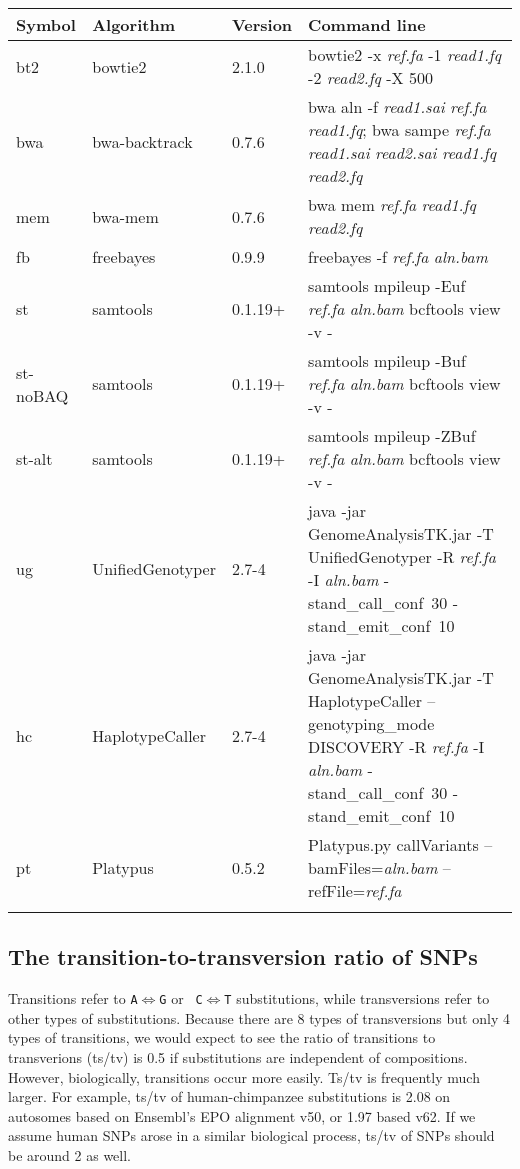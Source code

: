 \documentclass{bioinfo}
\begin{document}
\begin{table*}
\footnotesize
{}
{\begin{tabular*}{\textwidth}{@{\extracolsep{\fill}}lllp{12cm}}
\toprule
Symbol & Algorithm & Version & Command line \\
\midrule
bt2 & bowtie2 & 2.1.0 & bowtie2 -x \emph{ref.fa} -1 \emph{read1.fq} -2 \emph{read2.fq} -X 500 \\
bwa & bwa-backtrack & 0.7.6 & bwa aln -f \emph{read1.sai} \emph{ref.fa} \emph{read1.fq}; bwa sampe \emph{ref.fa} \emph{read1.sai} \emph{read2.sai} \emph{read1.fq} \emph{read2.fq} \\
mem & bwa-mem & 0.7.6 & bwa mem \emph{ref.fa} \emph{read1.fq} \emph{read2.fq} \\
fb & freebayes & 0.9.9 & freebayes -f \emph{ref.fa} \emph{aln.bam} \\
st & samtools & 0.1.19+ & samtools mpileup -Euf \emph{ref.fa} \emph{aln.bam} {\tt \char124} bcftools view -v - \\
st-noBAQ & samtools & 0.1.19+ & samtools mpileup -Buf \emph{ref.fa} \emph{aln.bam} {\tt \char124} bcftools view -v - \\
st-alt & samtools & 0.1.19+ & samtools mpileup -ZBuf \emph{ref.fa} \emph{aln.bam} {\tt \char124} bcftools view -v - \\
ug & UnifiedGenotyper & 2.7-4 & java -jar GenomeAnalysisTK.jar -T UnifiedGenotyper -R \emph{ref.fa} -I \emph{aln.bam} \mbox{-stand\_call\_conf 30} \mbox{-stand\_emit\_conf 10} \\
hc & HaplotypeCaller & 2.7-4 & java -jar GenomeAnalysisTK.jar -T HaplotypeCaller --genotyping\_mode DISCOVERY -R \emph{ref.fa} -I \emph{aln.bam} \mbox{-stand\_call\_conf 30} \mbox{-stand\_emit\_conf 10} \\
pt & Platypus & 0.5.2 & Platypus.py callVariants --bamFiles=\emph{aln.bam} --refFile=\emph{ref.fa} \\
\botrule
\end{tabular*}}{}
\end{table*}

\subsection{The transition-to-transversion ratio of SNPs}
Transitions refer to {\tt A}$\Leftrightarrow${\tt G} or {\tt
C}$\Leftrightarrow${\tt T} substitutions, while transversions refer to other
types of substitutions. Because there are 8 types of transversions but only 4
types of transitions, we would expect to see the ratio of transitions to
transverions (ts/tv) is 0.5 if substitutions are independent of compositions.
However, biologically, transitions occur more easily. Ts/tv is frequently much
larger. For example, ts/tv of human-chimpanzee substitutions is 2.08 on
autosomes based on Ensembl's EPO alignment v50, or 1.97 based v62. If we assume
human SNPs arose in a similar biological process, ts/tv of SNPs should be
around 2 as well.
\end{document}
